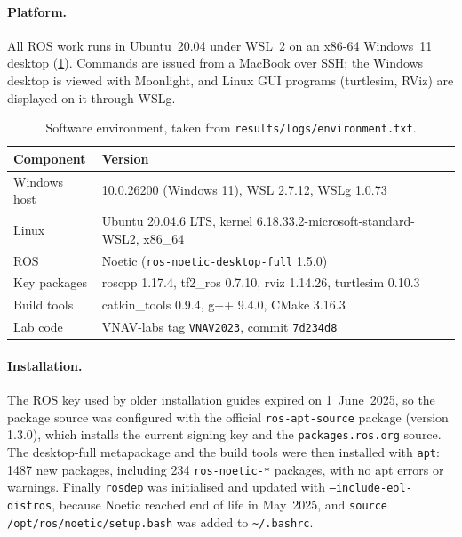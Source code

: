 \documentclass[a4paper]{tufte-handout}
\begin{document}

\paragraph{Platform.}
All ROS work runs in Ubuntu~20.04 under WSL~2 on an x86-64 Windows~11 desktop
(\cref{tab:env}).
Commands are issued from a MacBook over SSH; the Windows desktop is viewed with
Moonlight, and Linux GUI programs (turtlesim, RViz) are displayed on it through
WSLg.

\begin{table}[h]
\small
\begin{tabularx}{\linewidth}{@{}l X@{}}
\toprule
Component & Version \\
\midrule
Windows host & 10.0.26200 (Windows 11), WSL 2.7.12, WSLg 1.0.73 \\
Linux & Ubuntu 20.04.6 LTS, kernel 6.18.33.2-microsoft-standard-WSL2, x86\_64 \\
ROS & Noetic (\texttt{ros-noetic-desktop-full} 1.5.0) \\
Key packages & roscpp 1.17.4, tf2\_ros 0.7.10, rviz 1.14.26, turtlesim 0.10.3 \\
Build tools & catkin\_tools 0.9.4, g++ 9.4.0, CMake 3.16.3 \\
Lab code & VNAV-labs tag \texttt{VNAV2023}, commit \texttt{7d234d8} \\
\bottomrule
\end{tabularx}
\caption{Software environment, taken from \texttt{results/logs/environment.txt}.\protect\label{tab:env}}
\end{table}

\paragraph{Installation.}
The ROS key used by older installation guides expired on 1~June~2025, so the
package source was configured with the official \texttt{ros-apt-source}
package (version 1.3.0), which installs the current signing key and the
\texttt{packages.ros.org} source.\cite{roskeymigration}
The desktop-full metapackage and the build tools were then installed with
\texttt{apt}: 1487 new packages, including 234 \texttt{ros-noetic-*} packages,
with no apt errors or warnings.
Finally \texttt{rosdep} was initialised and updated with
\texttt{--include-eol-distros}, because Noetic reached end of life in May~2025,
and \texttt{source /opt/ros/noetic/setup.bash} was added to \texttt{\textasciitilde/.bashrc}.
\end{document}

